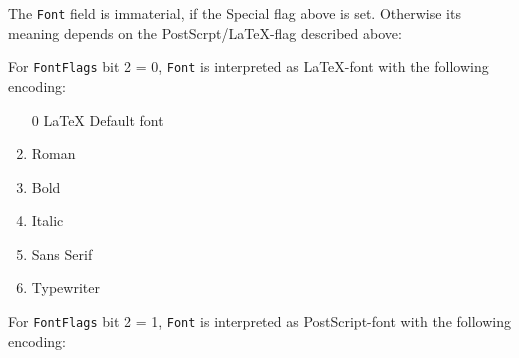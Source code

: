 \documentclass[10pt, a4paper]{article}
\begin{document}
The \texttt{Font} field is immaterial, if the Special flag above is set. 
Otherwise its meaning depends on the PostScrpt/\LaTeX-flag 
described above: 

For \texttt{FontFlags} bit 2 = 0, 
\texttt{Font} is interpreted as \LaTeX-font with the following encoding: 
%
\begin{enumerate}
\item[0] \LaTeX{} Default font
\item    Roman
\item    Bold
\item    Italic
\item    Sans Serif
\item    Typewriter
\end{enumerate}

For \texttt{FontFlags} bit 2 = 1, 
\texttt{Font} is interpreted as PostScript-font with the following encoding: 
\end{document}
